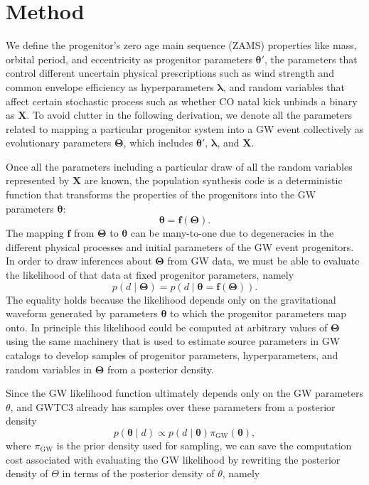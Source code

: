 \documentclass[twocolumn]{aastex631}
\begin{document}
\section{Method}
\label{sec:method}


We define the progenitor's zero age main sequence (ZAMS) properties like
mass, orbital period, and eccentricity as progenitor parameters $\bm{\theta'}$, the parameters
that control different uncertain physical prescriptions such as wind strength and common
envelope efficiency as hyperparameters $\bm{\lambda}$, and random variables
that affect certain stochastic process such as whether CO natal kick unbinds a
binary as $\bm{X}$. To avoid clutter in the following derivation, we denote all
the parameters related to mapping a particular progenitor system into a GW event
collectively as evolutionary parameters $\bm{\Theta}$, which includes
$\bm{\theta'}$, $\bm{\lambda}$, and $\bm{X}$.

Once all the parameters including a particular draw of all the random variables
represented by $\bm{X}$ are known, the population synthesis code is a
deterministic function that transforms the properties of the progenitors into
the GW parameters $\bm{\theta}$:
\begin{equation}
    \bm{\theta} = \bm{f}\left( \bm{\Theta} \right).
\end{equation}
The mapping $\bm{f}$ from $\bm{\Theta}$ to $\bm{\theta}$ can be many-to-one
due to degeneracies in the different physical processes and initial parameters  
of the GW event progenitors.
In order to draw inferences about $\bm{\Theta}$ from GW data, we
must be able to evaluate the likelihood of that data at fixed progenitor
parameters, namely
\begin{equation}
    p\left( d \mid \bm{\Theta} \right) = p\left( d \mid \bm{\theta} = \bm{f}\left( \bm{\Theta} \right) \right).
\end{equation}
The equality holds because the likelihood depends only on the gravitational waveform generated by
parameters $\bm{\theta}$ to which the progenitor parameters map onto.  In principle
this likelihood could be computed at arbitrary values of $\bm{\Theta}$ using the
same machinery that is used to estimate source parameters in GW
catalogs \citep{Veitch2015,Ashton2019,Romero-Shaw2020,GWTC-3} to develop samples
of progenitor parameters, hyperparameters, and random variables in
$\bm{\Theta}$ from a posterior density.

Since the GW likelihood function
ultimately depends only on the GW parameters $\theta$, and GWTC3 already has samples over these parameters from a posterior density 
\begin{equation}
    p\left( \bm{\theta} \mid d \right) \propto p\left( d \mid \bm{\theta} \right) \pi_\mathrm{GW} \left( \bm{\theta} \right),
\end{equation}
where $\pi_\mathrm{GW}$ is the prior density used for sampling,
we can save the computation cost associated with evaluating the GW likelihood by rewriting the posterior 
density of $\Theta$ in terms of the posterior density of $\theta$, namely
\end{document}
